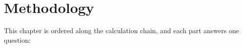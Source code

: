 %
%
\providecommand{\openpoint}[1]{\par\noindent\fbox{\parbox{0.97\linewidth}{%
  \textbf{Open point:} #1}}\par}

\chapter{Methodology}
\label{ch:methodology}

This chapter is ordered along the calculation chain, and each part
answers one question:

